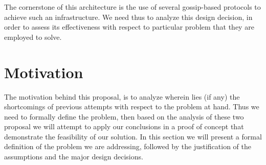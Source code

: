 \documentclass[11pt]{amsart}
\begin{document}
	The cornerstone of this architecture is the use of several gossip-based protocols to achieve such an 
	infrastructure. We need thus to analyze this design decision, in order to assess its effectiveness 
	with respect to particular problem that they are employed to solve.
	
	\section{Motivation}
	The motivation behind this proposal, is to analyze wherein lies (if any)
        the shortcomings of previous attempts with respect to the problem at
        hand. Thus we need to formally define the problem, then based on the
        analysis of these two proposal we will attempt to apply our conclusions
        in a proof of concept that demonstrate the feasibility of our
        solution. In this section we will present a formal definition of the
        problem we are addressing, followed by the justification of the
        assumptions and the major design decisions.
\end{document}
